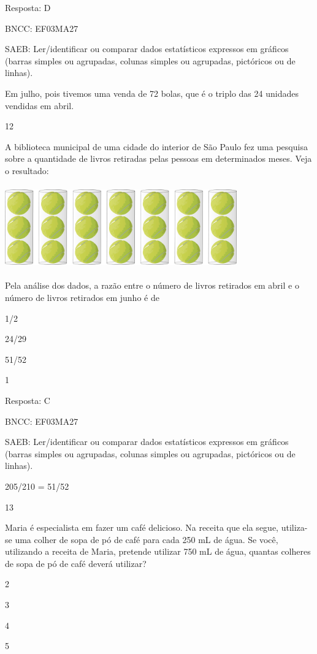 \begin{escolha}
{\begin{escolha}
{Resposta: D

BNCC: EF03MA27

SAEB: Ler/identificar ou comparar dados estatísticos
expressos em gráficos (barras simples ou agrupadas, colunas simples ou
agrupadas, pictóricos ou de linhas).

Em julho, pois tivemos uma venda de 72 bolas, que é o triplo das 24 unidades vendidas em abril.

\num{12}

A biblioteca municipal de uma cidade do interior de São Paulo fez uma
pesquisa sobre a quantidade de livros retiradas pelas pessoas em determinados meses. Veja o resultado:


\includegraphics[width=3.93590in,height=1.40906in]{media/image121.png}

Pela análise dos dados, a razão entre o número de livros retirados em abril e o número de livros retirados em junho é de

\begin{escolha}
\item
  1/2
\item
  24/29
\item
  51/52
\item
  1
\end{escolha}

Resposta: C

BNCC: EF03MA27

SAEB: Ler/identificar ou comparar dados estatísticos
expressos em gráficos (barras simples ou agrupadas, colunas simples ou
agrupadas, pictóricos ou de linhas).


205/210 = 51/52

\num{13}

Maria é especialista em fazer um café delicioso. Na receita que ela
segue, utiliza-se uma colher de sopa de pó de café para cada 250 mL
de água. Se você, utilizando a receita de Maria, pretende utilizar 750 mL de água, quantas colheres de sopa de pó de café deverá utilizar?

\begin{escolha}
\item
  2
\item
  3
\item
  4
\item
  5
\end{escolha}

}
\end{escolha}}
\end{escolha}
